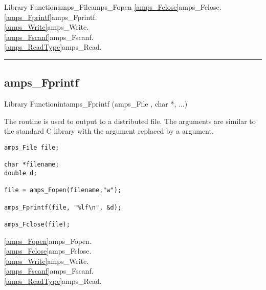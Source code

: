 \begin{deftypefn}{Library Function}{amps_File}{amps\_Fopen}
\SEEALSO
\vref{amps_Fclose}{amps\_Fclose}. \\
\vref{amps_Fprintf}{amps\_Fprintf}. \\
\vref{amps_Write}{amps\_Write}. \\
\vref{amps_Fscanf}{amps\_Fscanf}. \\
\vref{amps_ReadType}{amps\_Read}. \\

\end{deftypefn}


\noindent\rule{\textwidth}{1mm}

\subsection{amps\_Fprintf}
\label{amps_Fprintf}



\begin{deftypefn}{Library Function}{int}{amps\_Fprintf}
(amps_File , char *, ...)

\DESCRIPTION

The routine  is used to output to a distributed file.
The arguments are similar to the standard C library  with
the  argument replaced by a  argument.

\EXAMPLE
\begin{display}\begin{verbatim}
amps_File file;

char *filename;
double d;

file = amps_Fopen(filename,"w");

amps_Fprintf(file, "%lf\n", &d);

amps_Fclose(file);
\end{verbatim}\end{display}

\SEEALSO
\vref{amps_Fopen}{amps\_Fopen}. \\
\vref{amps_Fclose}{amps\_Fclose}. \\
\vref{amps_Write}{amps\_Write}. \\
\vref{amps_Fscanf}{amps\_Fscanf}. \\
\vref{amps_ReadType}{amps\_Read}. \\

\end{deftypefn}

